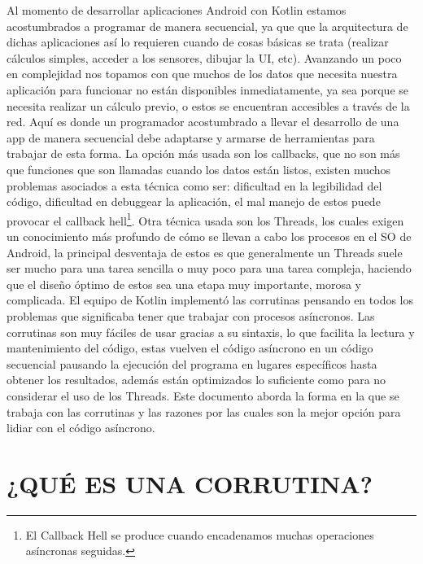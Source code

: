 \documentclass[twocolumn,10pt,abstract=on]{asme2ej}
\begin{document}
Al momento de desarrollar aplicaciones Android con Kotlin estamos acostumbrados a programar de manera secuencial, ya que que la arquitectura de dichas aplicaciones así lo requieren cuando de cosas básicas se trata (realizar cálculos simples, acceder a los sensores, dibujar la UI, etc). Avanzando un poco en complejidad nos topamos con que muchos de los datos que necesita nuestra aplicación para funcionar no están disponibles inmediatamente, ya sea porque se necesita realizar un cálculo previo, o estos se encuentran accesibles a través de la red. \linebreak\linebreak
Aquí es donde un programador acostumbrado a llevar el desarrollo de una app de manera secuencial debe adaptarse y armarse de herramientas para trabajar de esta forma. La opción más usada son los callbacks, que no son más que funciones que son llamadas cuando los datos están listos, existen muchos problemas asociados a esta técnica como ser: dificultad en la legibilidad del código, dificultad en debuggear la aplicación, el mal manejo de estos puede provocar el callback hell\footnote{El Callback Hell se produce cuando encadenamos muchas operaciones asíncronas seguidas.}.\linebreak\linebreak
Otra técnica usada son los Threads, los cuales exigen un conocimiento más profundo de cómo se llevan a cabo los procesos en el SO de Android, la principal desventaja de estos es que generalmente un Threads suele ser mucho para una tarea sencilla o muy poco para una tarea compleja, haciendo que el diseño óptimo de estos sea una etapa muy importante, morosa y complicada. El equipo de Kotlin implementó las corrutinas pensando en todos los problemas que significaba tener que trabajar con procesos asíncronos.\linebreak\linebreak
Las corrutinas son muy fáciles de usar gracias a su sintaxis, lo que facilita la lectura y mantenimiento del código, estas vuelven el código asíncrono en un código secuencial pausando la ejecución del programa en lugares específicos hasta obtener los resultados, además están optimizados lo suficiente como para no considerar el uso de los Threads.
Este documento aborda la forma en la que se trabaja con las corrutinas y las razones por las cuales son la mejor opción para lidiar con el código asíncrono.


\section{¿QUÉ ES UNA CORRUTINA?}
\end{document}
